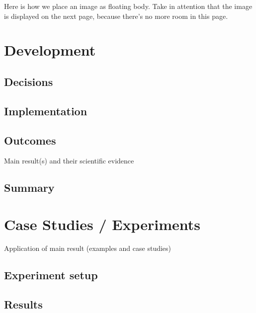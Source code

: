 \documentclass[oneside,11pt,a4paper,footinclude=true,headinclude=true,cleardoublepage=empty]{scrbook}
\begin{document}
	Here is how we place an image as floating body.
	Take in attention that the image is displayed on the next page, because there's no more room in this page.




	
	\chapter{Development}
		
	\section{Decisions}
    \section{Implementation}
    \section{Outcomes}
    Main result(s) and their scientific evidence
	\section{Summary}


	\chapter{Case Studies / Experiments}
		Application of main result (examples and case studies)
	\section{Experiment setup}
    \section{Results}
\end{document}
